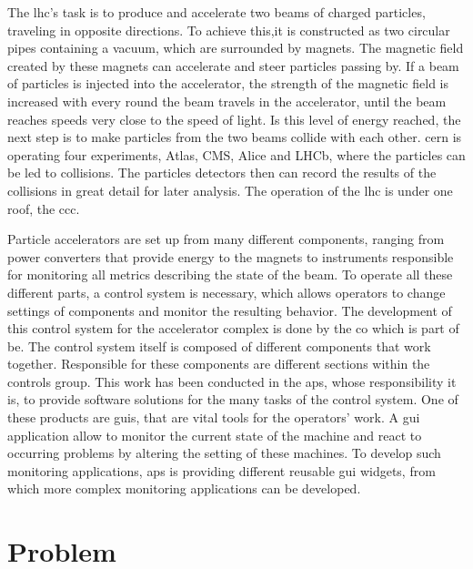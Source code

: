 The \gls{lhc}'s task is to produce and accelerate two beams of charged
particles, traveling in opposite directions. To achieve this,it is constructed
as two circular pipes containing a vacuum, which are surrounded by magnets. The
magnetic field created by these magnets can accelerate and steer particles
passing by. If a beam of particles is injected into the accelerator, the
strength of the magnetic field is increased with every round the beam travels in
the accelerator, until the beam reaches speeds very close to the speed of light.
Is this level of energy reached, the next step is to make particles from the two
beams collide with each other. \gls{cern} is operating four experiments, Atlas,
CMS, Alice and LHCb, where the particles can be led to collisions. The particles
detectors then can record the results of the collisions in great detail for
later analysis. The operation of the \gls{lhc} is under one roof, the \gls{ccc}.
\cite{CernLhc, HowParticleAccsWork}


Particle accelerators are set up from many different components, ranging from
power converters that provide energy to the magnets to instruments responsible
for monitoring all metrics describing the state of the beam. To operate all
these different parts, a control system is necessary, which allows operators to
change settings of components and monitor the resulting behavior. The
development of this control system for the accelerator complex is done by the
\gls{co} which is part of \gls{be}. \cite{ControlSystemBible} The control system
itself is composed of different components that work together. Responsible for
these components are different sections within the controls group.  This work
has been conducted in the \gls{aps}, whose responsibility it is, to provide
software solutions for the many tasks of the control system. One of these
products are \glspl{gui}, that are vital tools for the operators' work.  A
\gls{gui} application allow to monitor the current state of the machine and
react to occurring problems by altering the setting of these machines. To develop
such monitoring applications, \gls{aps} is providing different reusable
\gls{gui} widgets, from which more complex monitoring applications can be
developed.





\section{Problem}
\label{sec:Introduction:problem}

